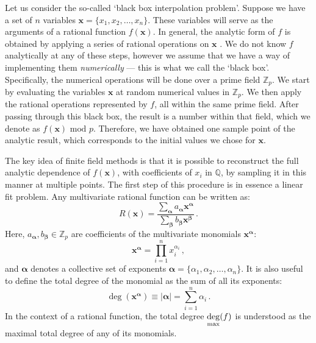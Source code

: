 \documentclass[main.tex]{subfiles}
\begin{document}
Let us consider the so-called `black box interpolation problem'. Suppose we have a set of $n$ variables $\mathbf{x}=\{x_1, x_2, \ldots, x_n\}$. These variables will serve as the arguments of a rational function $f(\mathbf{x})$. In general, the analytic form of $f$ is obtained by applying a series of rational operations on $\mathbf{x}$ . We do not know $f$ analytically at any of these steps, however we assume that we have a way of implementing them \textit{numerically} --- this is what we call the `black box'. Specifically, the numerical operations will be done over a prime field $\mathbb{Z}_p$. We start by evaluating the variables $\mathbf{x}$ at random numerical values in $\mathbb{Z}_p$. We then apply the rational operations represented by $f$, all within the same prime field. After passing through this black box, the result is a number within that field, which we denote as $f(\mathbf{x}) \text{ mod } p$. Therefore, we have obtained one sample point of the analytic result, which corresponds to the initial values we chose for $\mathbf{x}$.

The key idea of finite field methods is that it is possible to reconstruct the full analytic dependence of $f(\mathbf{x})$, with coefficients of $x_i$ in $\mathbb{Q}$, by sampling it in this manner at multiple points. The first step of this procedure is in essence a linear fit problem. Any multivariate rational function can be written as:
\begin{equation} \label{eq:ratfun}
     R(\mathbf{x}) = \frac{
     \sum_{\bm{\alpha}} a_{\bm{\alpha}} \mathbf{x}^{\bm{\alpha}}
     }{
     \sum_{\bm{\beta}} b_{\bm{\beta}} \mathbf{x}^{\bm{\beta}}
     }\,.
\end{equation}
Here, $a_{\bm{\alpha}}, b_{\bm{\beta}} \in \mathbb{Z}_p$ are coefficients of the multivariate monomials $\mathbf{x}^{\bm{\alpha}}$:
\begin{equation}
    \mathbf{x}^{\bm{\alpha}} = \prod_{i=1}^n x_i^{\alpha_i}\,,
\end{equation}
and $\bm{\alpha}$ denotes a collective set of exponents $\bm{\alpha} = \{\alpha_1, \alpha_2, \ldots, \alpha_n\}$. It is also useful to define the total degree of the monomial as the sum of all its exponents:
\begin{equation}
    \deg (\mathbf{x}^{\bm{\alpha}}) \equiv |\bm{\alpha}| = \sum_{i=1}^n \alpha_i\,.
\end{equation}
In the context of a rational function, the total degree $\underset{\text{max}}{\deg}(f)$ is understood as the maximal total degree of any of its monomials.
\end{document}
